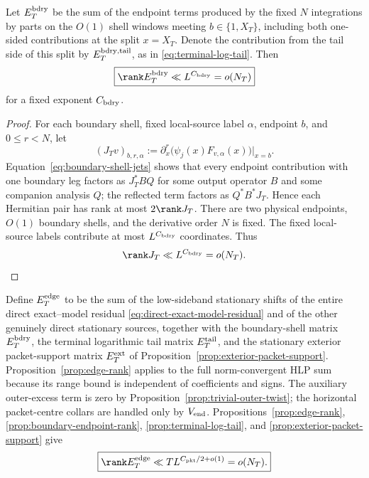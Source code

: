 \begin{proposition}
\label{prop:boundary-endpoint-rank}
Let $E_T^{\rm bdry}$ be the sum of the endpoint terms produced by the fixed
$N$ integrations by parts on the $O(1)$ shell windows meeting
$b\in\{1,X_T\}$, including both one-sided contributions at the split
$x=X_T$. Denote the contribution from the tail side of this split by
$E_T^{\rm bdry,tail}$, as in \eqref{eq:terminal-log-tail}. Then
\begin{equation}
\boxed{
\rank E_T^{\rm bdry}
\ll L^{C_{\rm bdry}}=o(N_T)
}
\label{eq:boundary-endpoint-rank}
\end{equation}
for a fixed exponent $C_{\rm bdry}$.
\end{proposition}

\begin{proof}
For each boundary shell, fixed local-source label $\alpha$, endpoint $b$, and
$0\le r<N$, let
\[
(J_Tv)_{b,r,\alpha}
:=\partial_x^r\!\bigl(\psi_j(x)F_{v,\alpha}(x)\bigr)\big|_{x=b}.
\]
Equation~\eqref{eq:boundary-shell-jets} shows that every endpoint contribution
with one boundary leg factors as $J_T^*BQ$ for some output operator $B$ and
some companion analysis $Q$; the reflected term factors as $Q^*B^*J_T$.
Hence each Hermitian pair has rank at most $2\rank J_T$. There are two physical
endpoints, $O(1)$ boundary shells, and the derivative order $N$ is fixed. The fixed local-source labels contribute at most $L^{C_{\rm bdry}}$
coordinates. Thus
\[
\rank J_T\ll L^{C_{\rm bdry}}=o(N_T).
\]
\end{proof}

Define $E_T^{\rm edge}$ to be the sum of the low-sideband stationary shifts of
the entire direct exact--model residual \eqref{eq:direct-exact-model-residual}
and of the other genuinely direct stationary sources, together with the
boundary-shell matrix $E_T^{\rm bdry}$, the terminal logarithmic tail matrix
$E_T^{\rm tail}$, and the stationary exterior packet-support matrix
$E_T^{\rm ext}$ of Proposition~\ref{prop:exterior-packet-support}.
Proposition~\ref{prop:edge-rank} applies to the full norm-convergent HLP sum
because its range bound is independent of coefficients and signs.  The
auxiliary outer-excess term is zero by
Proposition~\ref{prop:trivial-outer-twist}; the horizontal packet-centre collars
are handled only by $V_{\rm end}$.  Propositions~\ref{prop:edge-rank},
\ref{prop:boundary-endpoint-rank}, \ref{prop:terminal-log-tail}, and
\ref{prop:exterior-packet-support} give
\begin{equation}
\boxed{
\rank E_T^{\rm edge}
\ll T L^{C_{\rm pkt}/2+o(1)}=o(N_T).
}
\label{eq:total-edge-rank}
\end{equation}

